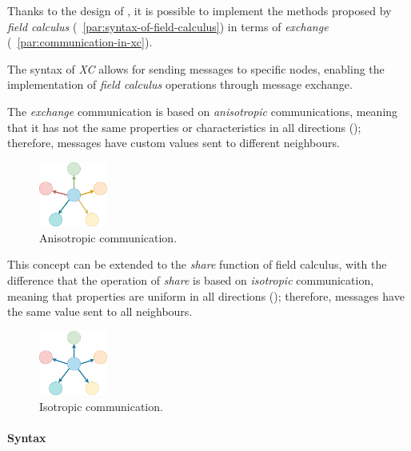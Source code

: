 Thanks to the design of \xc{}, it is possible to implement the methods proposed by \emph{field calculus}
(~\ref{par:syntax-of-field-calculus}) in terms of \emph{exchange} (~\ref{par:communication-in-xc}).

The syntax of \emph{XC} allows for sending messages to specific nodes, enabling the implementation of \emph{field calculus}
operations through message exchange.

The \emph{exchange} communication is based on \emph{anisotropic} communications, meaning that it has not the same properties
or characteristics in all directions (); therefore, messages have custom values sent to different neighbours.

\begin{figure}[h!]
    \centering
    \includegraphics[width=0.2\textwidth]{figures/anisotropic}
    \caption{Anisotropic communication.}
    \label{fig:anisotropic}
\end{figure}

This concept can be extended to the \emph{share} function of field calculus, with the difference that the
operation of \emph{share} is based on \emph{isotropic} communication, meaning that properties are uniform in all directions
(); therefore, messages have the same value sent to all neighbours.

\begin{figure}[h!]
    \centering
    \includegraphics[width=0.2\textwidth]{figures/isotropic}
    \caption{Isotropic communication.}
    \label{fig:isotropic}
\end{figure}

\paragraph{Syntax}

